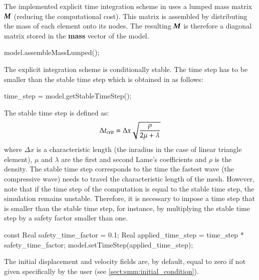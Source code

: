 The implemented explicit time integration scheme in \akantu uses a
lumped mass matrix $\boldsymbol{M}$ (reducing the computational cost). This
matrix is assembled by distributing the mass of each element onto its
nodes. The resulting $\boldsymbol{M}$ is therefore a diagonal matrix stored
in the \textbf{mass} vector of the model.


\begin{cpp} model.assembleMassLumped();
\end{cpp} 

The explicit integration scheme is conditionally stable. The time step
has to be smaller than the stable time step which is obtained in
\akantu as follows:

\begin{cpp} time_step = model.getStableTimeStep();
\end{cpp} 

The stable time step is defined as:
\begin{equation}\label{eqn:smm:explicit:stabletime} \Delta
t_{{\mathrm{crit}}} = \Delta x \sqrt{\frac{\rho}{2 \mu + \lambda}}
\end{equation} where $\Delta x$ is a characteristic length (\eg the
inradius in the case of linear triangle element), $\mu$ and $\lambda$
are the first and second Lame's coefficients and $\rho$ is the
density.  The stable time step corresponds to the time the fastest
wave (the compressive wave) needs to travel the characteristic length
of the mesh.  However, note that if the time step of the computation
is equal to the stable time step, the simulation remains
unstable. Therefore, it is necessary to impose a time step that is
smaller than the stable time step, for instance, by multiplying the
stable time step by a safety factor smaller than one.

\begin{cpp} const Real safety_time_factor = 0.1; Real
applied_time_step = time_step * safety_time_factor;
model.setTimeStep(applied_time_step);
\end{cpp} 

The initial displacement and velocity fields are, by default, equal to
zero if not given specifically by the user (see
\ref{sect:smm:initial_condition}).

